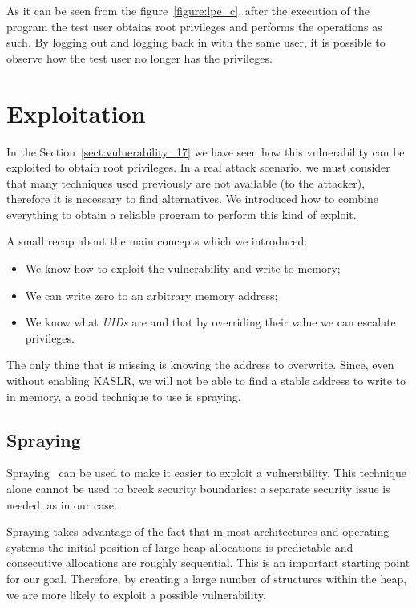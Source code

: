 \documentclass{masterthesis}
\newcommand{\refToSection}[1]{Section~\ref{sect:#1}\xspace}
\begin{document}
As it can be seen from the figure~\ref{figure:lpe_c}, after the execution of the program the test user obtains root privileges and performs the operations as such.
By logging out and logging back in with the same user, it is possible to observe how the test user no longer has the privileges.

\section{Exploitation}
\label{sect:exp-cve}   
 
In the \refToSection{vulnerability_17} we have seen how this vulnerability can be exploited to obtain root privileges. In a real attack scenario, we must consider that many techniques used previously are not available (to the attacker), therefore it is necessary to find alternatives.
We introduced how to combine everything to obtain a reliable program to perform this kind of exploit.

A small recap about the main concepts which we introduced:
\begin{itemize}
   \item We know how to exploit the vulnerability and write to memory;
   \item We can write zero to an arbitrary memory address;
   \item We know what \emph{UIDs} are and that by overriding their value we can escalate privileges.
\end {itemize}

The only thing that is missing is knowing the address to overwrite.
Since, even without enabling KASLR, we will not be able to find a stable address to write to in memory, a good technique to use is spraying.

\subsection{Spraying}
\label{subsect:spraying}

Spraying~\cite{ratanaworabhan2009nozzle} can be used to make it easier to exploit a vulnerability. This technique alone cannot be used to break security boundaries: a separate security issue is needed, as in our case.

Spraying takes advantage of the fact that in most architectures and operating systems the initial position of large heap allocations is predictable and consecutive allocations are roughly sequential. This is an important starting point for our goal.
Therefore, by creating a large number of structures within the heap, we are more likely to exploit a possible vulnerability.
\end{document}
